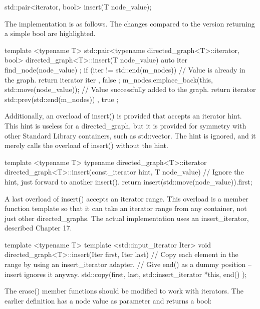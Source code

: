 \begin{cpp}
std::pair<iterator, bool> insert(T node_value);
\end{cpp}

The implementation is as follows. The changes compared to the version returning a simple bool are highlighted.

\begin{cpp}
template <typename T>
std::pair<typename directed_graph<T>::iterator, bool>
    directed_graph<T>::insert(T node_value)
{
    auto iter { find_node(node_value) };
    if (iter != std::end(m_nodes)) {
        // Value is already in the graph.
        return { iterator { iter }, false };
    }
    m_nodes.emplace_back(this, std::move(node_value));
    // Value successfully added to the graph.
    return { iterator { std::prev(std::end(m_nodes)) }, true };
}
\end{cpp}

Additionally, an overload of insert() is provided that accepts an iterator hint. This hint is useless for a directed\_graph, but it is provided for symmetry with other Standard Library containers, such as std::vector. The hint is ignored, and it merely calls the overload of insert() without the hint.

\begin{cpp}
template <typename T>
typename directed_graph<T>::iterator
    directed_graph<T>::insert(const_iterator hint, T node_value)
{
    // Ignore the hint, just forward to another insert().
    return insert(std::move(node_value)).first;
}
\end{cpp}

A last overload of insert() accepts an iterator range. This overload is a member function template so that it can take an iterator range from any container, not just other directed\_graphs. The actual implementation uses an insert\_iterator, described Chapter 17.

\begin{cpp}
template <typename T>
template <std::input_iterator Iter>
void directed_graph<T>::insert(Iter first, Iter last)
{
    // Copy each element in the range by using an insert_iterator adapter.
    // Give end() as a dummy position -- insert ignores it anyway.
    std::copy(first, last, std::insert_iterator { *this, end() });
}
\end{cpp}

The erase() member functions should be modified to work with iterators. The earlier definition has a node value as parameter and returns a bool:

